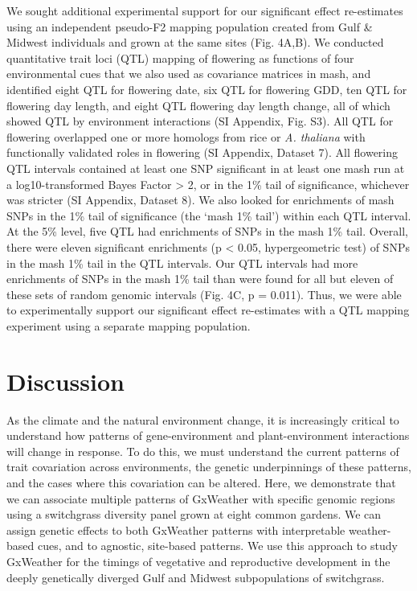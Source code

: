\documentclass[
  9pt,
  twocolumn,
  twoside]{pnas-new}
\begin{document}
We sought additional experimental support for our significant effect
re-estimates using an independent pseudo-F2 mapping population created
from Gulf \& Midwest individuals and grown at the same sites (Fig.
4A,B). We conducted quantitative trait loci (QTL) mapping of flowering
as functions of four environmental cues that we also used as covariance
matrices in mash, and identified eight QTL for flowering date, six QTL
for flowering GDD, ten QTL for flowering day length, and eight QTL
flowering day length change, all of which showed QTL by environment
interactions (SI Appendix, Fig. S3). All QTL for flowering overlapped
one or more homologs from rice or \emph{A. thaliana} with functionally
validated roles in flowering (SI Appendix, Dataset 7). All flowering QTL
intervals contained at least one SNP significant in at least one mash
run at a log10-transformed Bayes Factor \textgreater{} 2, or in the 1\%
tail of significance, whichever was stricter (SI Appendix, Dataset 8).
We also looked for enrichments of mash SNPs in the 1\% tail of
significance (the `mash 1\% tail') within each QTL interval. At the 5\%
level, five QTL had enrichments of SNPs in the mash 1\% tail. Overall,
there were eleven significant enrichments (p \textless{} 0.05,
hypergeometric test) of SNPs in the mash 1\% tail in the QTL intervals.
Our QTL intervals had more enrichments of SNPs in the mash 1\% tail than
were found for all but eleven of these sets of random genomic intervals
(Fig. 4C, p = 0.011). Thus, we were able to experimentally support our
significant effect re-estimates with a QTL mapping experiment using a
separate mapping population.

\section{Discussion}\label{discussion}

As the climate and the natural environment change, it is increasingly
critical to understand how patterns of gene-environment and
plant-environment interactions will change in response. To do this, we
must understand the current patterns of trait covariation across
environments, the genetic underpinnings of these patterns, and the cases
where this covariation can be altered. Here, we demonstrate that we can
associate multiple patterns of GxWeather with specific genomic regions
using a switchgrass diversity panel grown at eight common gardens. We
can assign genetic effects to both GxWeather patterns with interpretable
weather-based cues, and to agnostic, site-based patterns. We use this
approach to study GxWeather for the timings of vegetative and
reproductive development in the deeply genetically diverged Gulf and
Midwest subpopulations of switchgrass.
\end{document}
